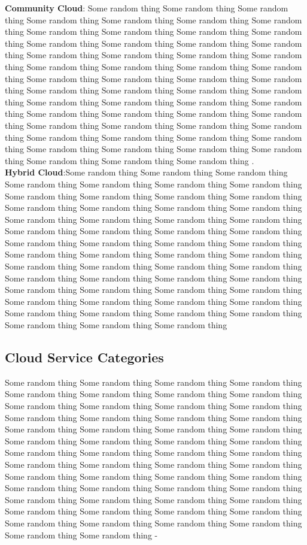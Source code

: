 \textbf{Community Cloud}: Some random thing Some random thing Some random thing Some random thing Some random thing Some random thing Some random thing Some random thing Some random thing Some random thing Some random thing Some random thing Some random thing Some random thing Some random thing Some random thing Some random thing Some random thing Some random thing Some random thing Some random thing Some random thing Some random thing Some random thing Some random thing Some random thing Some random thing Some random thing Some random thing Some random thing Some random thing Some random thing Some random thing Some random thing Some random thing Some random thing Some random thing Some random thing Some random thing Some random thing Some random thing Some random thing Some random thing Some random thing Some random thing Some random thing Some random thing Some random thing Some random thing Some random thing Some random thing Some random thing Some random thing Some random thing . \\
\textbf{Hybrid Cloud}:Some random thing Some random thing Some random thing Some random thing Some random thing Some random thing Some random thing Some random thing Some random thing Some random thing Some random thing Some random thing Some random thing Some random thing Some random thing Some random thing Some random thing Some random thing Some random thing Some random thing Some random thing Some random thing Some random thing Some random thing Some random thing Some random thing Some random thing Some random thing Some random thing Some random thing Some random thing Some random thing Some random thing Some random thing Some random thing Some random thing Some random thing Some random thing Some random thing Some random thing Some random thing Some random thing Some random thing Some random thing Some random thing Some random thing Some random thing Some random thing Some random thing Some random thing Some random thing Some random thing Some random thing Some random thing \\

\subsection{Cloud Service Categories}

Some random thing Some random thing Some random thing Some random thing Some random thing Some random thing Some random thing Some random thing Some random thing Some random thing Some random thing Some random thing Some random thing Some random thing Some random thing Some random thing Some random thing Some random thing Some random thing Some random thing Some random thing Some random thing Some random thing Some random thing Some random thing Some random thing Some random thing Some random thing Some random thing Some random thing Some random thing Some random thing Some random thing Some random thing Some random thing Some random thing Some random thing Some random thing Some random thing Some random thing Some random thing Some random thing Some random thing Some random thing Some random thing Some random thing Some random thing Some random thing Some random thing Some random thing Some random thing Some random thing Some random thing Some random thing  -\\
